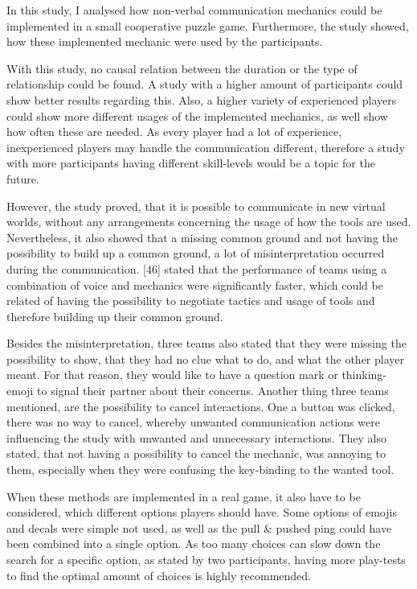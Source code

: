 In this study, I analysed how non-verbal communication mechanics could be implemented in a small cooperative puzzle game. Furthermore, the study showed, how these implemented mechanic were used by the participants.

With this study, no causal relation between the duration or the type of relationship could be found. 
A study with a higher amount of participants could show better results regarding this.
Also, a higher variety of experienced players could show more different usages of the implemented mechanics, as well show how often these are needed. 
As every player had a lot of experience, inexperienced players may handle the communication different, therefore a study with more participants having different skill-levels would be a topic for the future.

However, the study proved, that it is possible to communicate in new virtual worlds, without any arrangements concerning the usage of how the tools are used. Nevertheless, it also showed that a missing common ground and not having the possibility to build up a common ground, a lot of misinterpretation occurred during the communication.
\textcite{Vaddi2016Investigating2}[46] stated that the performance of teams using a combination of voice and mechanics were significantly faster, which could be related of having the possibility to negotiate tactics and usage of tools and therefore building up their common ground.

Besides the misinterpretation, three teams also stated that they were missing the possibility to show, that they had no clue what to do, and what the other player meant. For that reason, they would like to have a question mark or thinking-emoji to signal their partner about their concerns.
Another thing three teams mentioned, are the possibility to cancel interactions. One a button was clicked, there was no way to cancel, whereby unwanted communication actions were influencing the study with unwanted and unnecessary interactions. They also stated, that not having a possibility to cancel the mechanic, was annoying to them, especially when they were confusing the key-binding to the wanted tool.

When these methods are implemented in a real game, it also have to be considered, which different options players should have. Some options of emojis and decals were simple not used, as well as the pull & pushed ping could have been combined into a single option. As too many choices can slow down the search for a specific option, as stated by two participants, having more play-tests to find the optimal amount of choices is highly recommended.